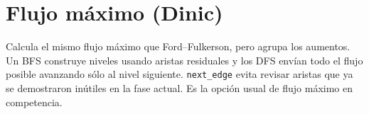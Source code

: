 
\section{Flujo m\'aximo (Dinic)}

Calcula el mismo flujo m\'aximo que Ford--Fulkerson, pero agrupa los aumentos.
Un BFS construye niveles usando aristas residuales y los DFS env\'ian todo el
flujo posible avanzando s\'olo al nivel siguiente. \texttt{next\_edge} evita
revisar aristas que ya se demostraron in\'utiles en la fase actual. Es la opci\'on
usual de flujo m\'aximo en competencia.


